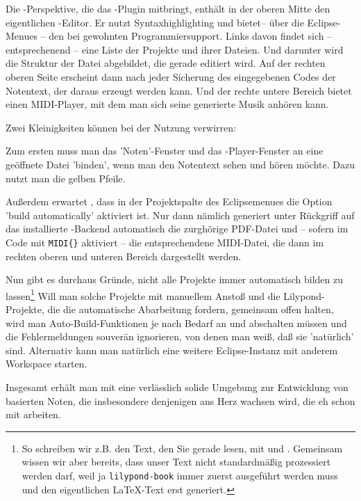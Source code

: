 Die -Perspektive, die das -Plugin mitbringt, enthält
in der oberen Mitte den eigentlichen -Editor. Er nutzt
Syntaxhighlighting und bietet-- über die Eclipse-Menues -- den bei 
gewohnten Programmiersupport. Links davon findet sich -- entsprechenend -- eine
Liste der Projekte und ihrer Dateien. Und darunter wird die Struktur der Datei
abgebildet, die gerade editiert wird. Auf der rechten oberen Seite erscheint
dann nach jeder Sicherung des eingegebenen Codes der Notentext, der daraus
erzeugt werden kann. Und der rechte untere Bereich bietet einen MIDI-Player, mit
dem man sich seine generierte Musik anhören kann.

Zwei Kleinigkeiten können bei der Nutzung verwirren: 

Zum ersten muss man das 'Noten'-Fenster und das -Player-Fenster an
eine geöffnete Datei 'binden', wenn man den Notentext sehen und hören möchte.
Dazu nutzt man die gelben Pfeile.

Außerdem erwartet , dass in der Projektspalte des Eclipsemenues die
Option 'build automatically' aktiviert ist. Nur dann nämlich generiert
 unter Rückgriff auf das installierte -Backend
automatisch die zurghörige PDF-Datei und -- sofern im Code mit \texttt{MIDI\{\}}
aktiviert -- die entsprechendene MIDI-Datei, die dann im rechten oberen und
unteren Bereich dargestellt werden.

Nun gibt es durchaus Gründe, nicht alle Projekte immer automatisch bilden zu
lassen\footnote{So schreiben wir z.B. den Text, den Sie gerade lesen, mit
 und . Gemeinsam wissen wir aber bereits, dass unser
Text nicht standardmäßig prozessiert werden darf, weil ja \texttt{lilypond-book}
immer zuerst ausgeführt werden muss und den eigentlichen \LaTeX-Text erst
generiert.} Will man solche Projekte mit manuellem Anstoß und die
Lilypond-Projekte, die die automatische Abarbeitung fordern, gemeinsam offen
halten, wird man Auto-Build-Funktionen je nach Bedarf an und abschalten müssen
und die Fehlermeldungen souverän ignorieren, von denen man weiß, daß sie
'natürlich' sind. Alternativ kann man natürlich eine weitere Eclipse-Instanz mit
anderem Workspace starten.

Insgesamt erhält man mit  eine verlässlich solide Umgebung zur
Entwicklung von  basierten Noten, die insbesondere denjenigen ans
Herz wachsen wird, die eh schon mit  arbeiten.

% 
